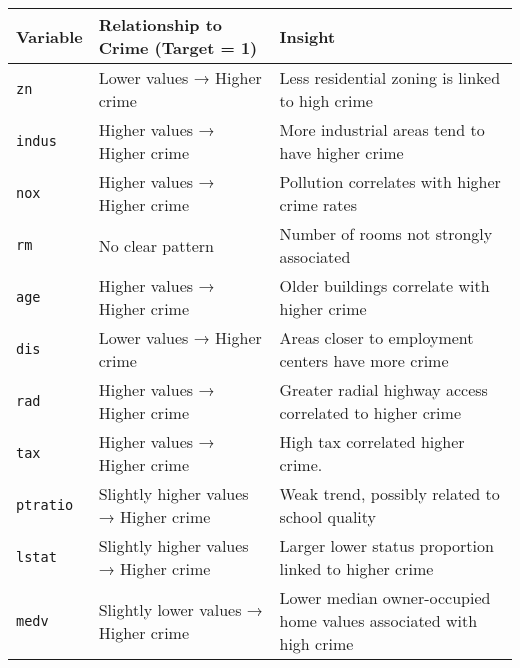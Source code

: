 \documentclass[
]{article}
\begin{document}
\begin{longtable}[]{@{}
  >{\raggedright\arraybackslash}p{}
  >{\raggedright\arraybackslash}p{}
  >{\raggedright\arraybackslash}p{}@{}}
\toprule\noalign{}
\begin{minipage}[b]{\linewidth}\raggedright
Variable
\end{minipage} & \begin{minipage}[b]{\linewidth}\raggedright
Relationship to Crime (Target = 1)
\end{minipage} & \begin{minipage}[b]{\linewidth}\raggedright
Insight
\end{minipage} \\
\midrule\noalign{}
\endhead
\bottomrule\noalign{}
\endlastfoot
\texttt{zn} & Lower values → Higher crime & Less residential zoning is
linked to high crime \\
\texttt{indus} & Higher values → Higher crime & More industrial areas
tend to have higher crime \\
\texttt{nox} & Higher values → Higher crime & Pollution correlates with
higher crime rates \\
\texttt{rm} & No clear pattern & Number of rooms not strongly
associated \\
\texttt{age} & Higher values → Higher crime & Older buildings correlate
with higher crime \\
\texttt{dis} & Lower values → Higher crime & Areas closer to employment
centers have more crime \\
\texttt{rad} & Higher values → Higher crime & Greater radial highway
access correlated to higher crime \\
\texttt{tax} & Higher values → Higher crime & High tax correlated higher
crime. \\
\texttt{ptratio} & Slightly higher values → Higher crime & Weak trend,
possibly related to school quality \\
\texttt{lstat} & Slightly higher values → Higher crime & Larger lower
status proportion linked to higher crime \\
\texttt{medv} & Slightly lower values → Higher crime & Lower median
owner-occupied home values associated with high crime \\
\end{longtable}
\end{document}
